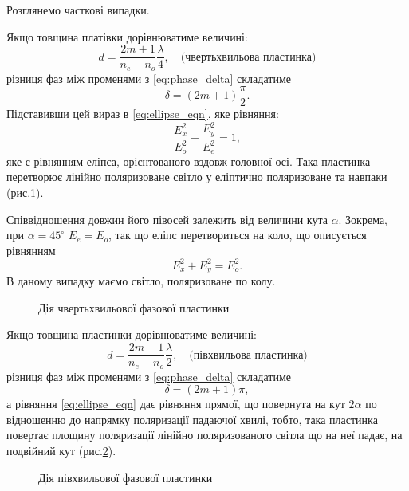 Розглянемо часткові випадки.

Якщо товщина платівки дорівнюватиме величині:
\begin{equation}\label{eq:lambda/4}
    d = \frac{2m+1}{n_e - n_o}\frac\lambda4, \quad \text{(чвертьхвильова пластинка)}
\end{equation}
різниця фаз між променями з \eqref{eq:phase_delta} складатиме
\begin{equation*}
    \delta = (2m+1)\frac\pi2.
\end{equation*}
Підставивши цей вираз в \eqref{eq:ellipse_eqn}, яке рівняння:
\begin{equation*}
        \frac{E_x^2}{E_o^2} + \frac{E_y^2}{E_e^2} = 1,
\end{equation*}
яке є рівнянням еліпса, орієнтованого вздовж головної осі. Така пластинка перетворює лінійно поляризоване світло у еліптично
поляризоване та навпаки (рис.\ref{pic:lambda/4}).

Співвідношення довжин його півосей залежить від величини
кута $ \alpha $. Зокрема, при $ \alpha = 45^\circ $ $ E_e = E_o $, так що еліпс перетвориться на коло, що описується рівнянням
\begin{equation*}
        E_x^2 + E_y^2 = E_o^2.
\end{equation*}
В даному випадку маємо світло, поляризоване по колу.

\begin{figure}[h!]\centering

\caption{Дія чвертьхвильової фазової пластинки}
\label{pic:lambda/4}
\end{figure}


Якщо товщина пластинки дорівнюватиме величині:
\begin{equation}\label{eq:lambda/2}
    d = \frac{2m+1}{n_e - n_o}\frac\lambda2, \quad \text{(півхвильова пластинка)}
\end{equation}
різниця фаз між променями з \eqref{eq:phase_delta} складатиме
\begin{equation*}
    \delta = (2m+1)\pi,
\end{equation*}
а рівняння \eqref{eq:ellipse_eqn} дає рівняння прямої, що повернута на кут $2\alpha $  по відношенню до напрямку поляризації падаючої хвилі, тобто, така пластинка повертає площину поляризації лінійно поляризованого світла
що на неї падає, на подвійний кут (рис.\ref{pic:lambda/2}).


\begin{figure}[h!]\centering

\caption{Дія півхвильової фазової пластинки}
\label{pic:lambda/2}
\end{figure}


